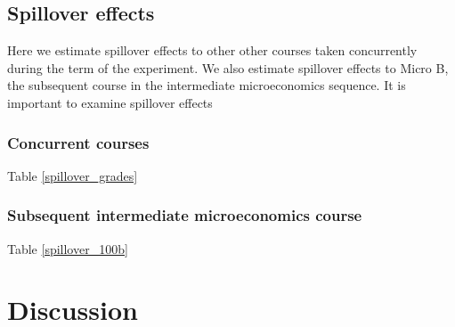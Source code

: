 \documentclass[12pt]{article}
\begin{document}
\subsection{Spillover effects}

Here we estimate spillover effects to other other courses taken concurrently during the term of the experiment. We also estimate spillover effects to Micro B, the subsequent course in the intermediate microeconomics sequence. It is important to examine spillover effects

\subsubsection{Concurrent courses}

Table \ref{spillover_grades}

\subsubsection{Subsequent intermediate microeconomics course}

Table \ref{spillover_100b}




\section{Discussion} \label{discussion}
\end{document}
